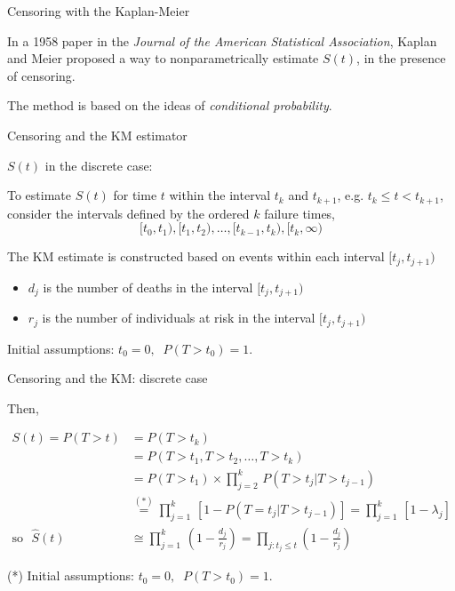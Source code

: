 \documentclass[ignorenonframetext,]{beamer}
\begin{document}
\begin{frame}{%
\protect\hypertarget{censoring-with-the-kaplan-meier}{%
Censoring with the Kaplan-Meier}}

In a 1958 paper in the \emph{Journal of the American Statistical
Association}, Kaplan and Meier proposed a way to nonparametrically
estimate \(S(t)\), in the presence of censoring.

The method is based on the ideas of \emph{conditional probability}.

\end{frame}

\begin{frame}{%
\protect\hypertarget{censoring-and-the-km-estimator}{%
Censoring and the KM estimator}}

\(S(t)\) in the discrete case:

To estimate \(S(t)\) for time \(t\) within the interval \(t_k\) and
\(t_{k+1}\), e.g. \(t_k \leq t < t_{k+1}\), consider the intervals
defined by the ordered \(k\) failure times, \[ 
[t_{0}, t_{1}), [t_{1}, t_{2}), \ldots, [t_{k-1}, t_{k}), [t_{k}, \infty)
\]

The KM estimate is constructed based on events within each interval
\([t_{j}, t_{j+1})\)

\begin{itemize}
\item
  \(d_j\) is the number of deaths in the interval \([t_{j}, t_{j+1})\)
\item
  \(r_j\) is the number of individuals at risk in the interval
  \([t_{j}, t_{j+1})\)
\end{itemize}

Initial assumptions: \(t_0=0, \;\; P(T > t_0) = 1.\)

\end{frame}

\begin{frame}{%
\protect\hypertarget{censoring-and-the-km-discrete-case}{%
Censoring and the KM: discrete case}}

Then,

\begin{align*}
S(t)=  P(T >t) &=  P(T > t_{k}) \\
   &=  P(T >  t_1, T > t_2,\ldots,T >  t_{k})\\
   &=  P(T >  t_1) \times \prod_{j=2}^k \, P(T >  t_{j}|T >  t_{j-1}) \\
&\stackrel{(*)}{=}  \prod_{j=1}^k \, [1-P(T=t_j|T >  t_{j-1})] = \prod_{j=1}^k \, [1-\lambda_j]\\
\mbox{so}~~~ \widehat{S}(t) &\cong  \prod_{j=1}^k \, \left(1-\frac{d_j}{r_j}\right) =
\prod_{j:t_j \leq t}\left(1-\frac{d_j}{r_j}\right)
\end{align*}

\footnotesize

(*) Initial assumptions: \(t_0=0, \;\; P(T > t_0)=1.\)

\end{frame}
\end{document}
